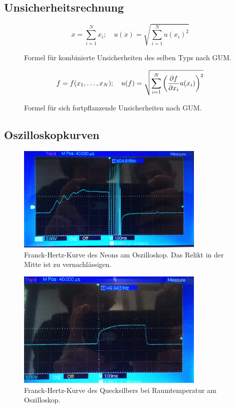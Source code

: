 \subsection{Unsicherheitsrechnung}\label{VGuD}

\begin{figure}[h]
	\begin{equation*}
		x = \sum_{i=1}^{N} x_i
		;\quad
		u(x) = \sqrt{\sum_{i = 1}^{N} u(x_i)^2}
	\end{equation*}
	\caption{Formel für kombinierte Unsicherheiten des selben Typs nach GUM.}
	\label{fig:GUM_combine}
\end{figure}

\begin{figure}[h]
	\begin{align*}
		f = f(x_1, \dots , x_N)
		;\quad
		u(f) = \sqrt{\sum_{i = 1}^{N}\left(\pdv{f}{x_i} u(x_i)\right) ^2}
	\end{align*}
	\caption{Formel für sich fortpflanzende Unsicherheiten nach GUM.}
	\label{fig:GUM_formula}
\end{figure}

\subsection{Oszilloskopkurven}

\begin{figure}[ht]
	\centering
	\includegraphics[width=0.8\textwidth]{bilder/ne.jpg}
	\caption{Franck-Hertz-Kurve des Neons am Oszilloskop. Das Relikt in der Mitte ist zu vernachlässigen.}
	\label{fig:kurveNe}	
\end{figure}

\begin{figure}[ht]
	\centering
	\includegraphics[width=0.8\textwidth]{bilder/hgl.jpg}
	\caption{Franck-Hertz-Kurve des Quecksilbers bei Raumtemperatur am Oszilloskop.}
	\label{fig:kurveHgl}	
\end{figure}

